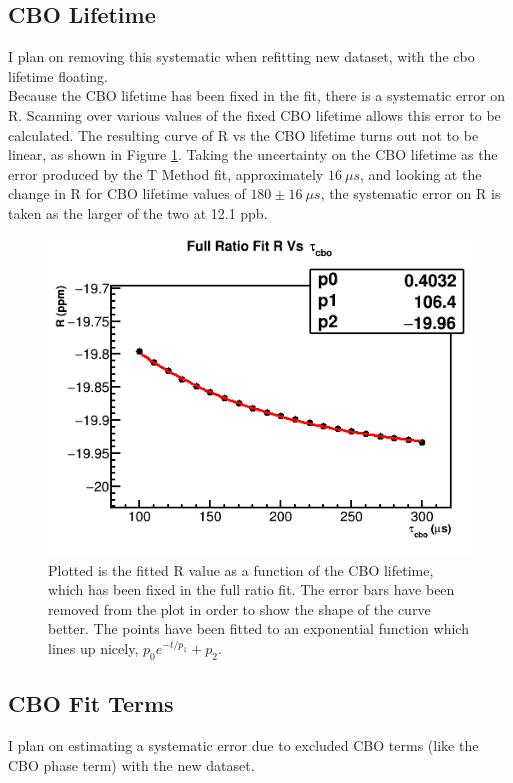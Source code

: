 	\subsection{CBO Lifetime}

		I plan on removing this systematic when refitting new dataset, with the cbo lifetime floating. \\

		Because the CBO lifetime has been fixed in the fit, there is a systematic error on R. Scanning over various values of the fixed CBO lifetime allows this error to be calculated. The resulting curve of R vs the CBO lifetime turns out not to be linear, as shown in Figure \ref{fig:CBOLifetime}. Taking the uncertainty on the CBO lifetime as the error produced by the T Method fit, approximately $\SI{16}{\mu s}$, and looking at the change in R for CBO lifetime values of $180 \pm \SI{16}{\mu s}$, the systematic error on R is taken as the larger of the two at 12.1 ppb.

		\begin{figure}[]
			\centering
			\includegraphics[width=.6\textwidth]{RatioCBO_R_Vs_tau_cbo_Canv}
		    \caption[CBOLifetime]{Plotted is the fitted R value as a function of the CBO lifetime, which has been fixed in the full ratio fit. The error bars have been removed from the plot in order to show the shape of the curve better. The points have been fitted to an exponential function which lines up nicely, $p_{0} e^{-t/p_{1}} + p_{2}$.}
		    \label{fig:CBOLifetime}
		\end{figure}

	\subsection{CBO Fit Terms}
	\label{SubSec:CBOFitTerms}

		I plan on estimating a systematic error due to excluded CBO terms (like the CBO phase term) with the new dataset.



